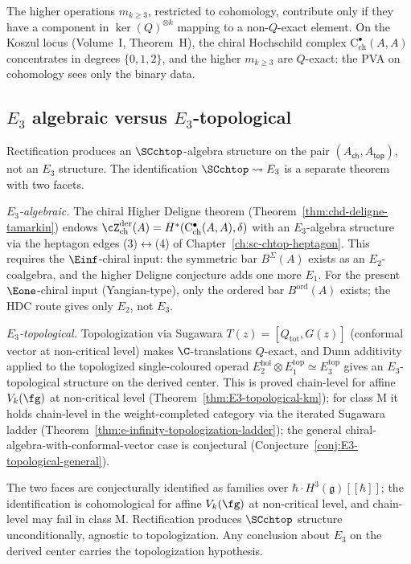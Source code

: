 The higher operations $m_{k \geq 3}$, restricted to cohomology,
contribute only if they have a component in $\ker(Q)^{\otimes k}$
mapping to a non-$Q$-exact element. On the Koszul locus
(Volume~I, Theorem~H), the chiral Hochschild complex
$\mathrm{C}^\bullet_{\mathrm{ch}}(A, A)$ concentrates in degrees
$\{0, 1, 2\}$, and the higher $m_{k \geq 3}$ are $Q$-exact: the PVA
on cohomology sees only the binary data.

\subsection{$E_3$ algebraic versus $E_3$-topological}
\label{subsec:e3-algebraic-vs-topological}

Rectification produces an $\SCchtop$-algebra structure on the pair
$(A_{\mathsf{ch}}, A_{\mathsf{top}})$, not an $E_3$ structure. The
identification $\SCchtop \rightsquigarrow E_3$ is a separate theorem
with two facets.

\emph{$E_3$-algebraic.} The chiral Higher Deligne theorem
(Theorem~\ref{thm:chd-deligne-tamarkin}) endows
$\cZ^{\mathrm{der}}_{\mathrm{ch}}(A) =
H^*(\mathrm{C}^\bullet_{\mathrm{ch}}(A, A), \delta)$ with an
$E_3$-algebra structure via the heptagon edges
(3)$\leftrightarrow$(4) of Chapter~\ref{ch:sc-chtop-heptagon}. This
requires the $\Einf$-chiral input: the symmetric bar $B^\Sigma(A)$
exists as an $E_2$-coalgebra, and the higher Deligne conjecture
adds one more $E_1$. For the present $\Eone$-chiral input
(Yangian-type), only the ordered bar $B^{\mathrm{ord}}(A)$ exists;
the HDC route gives only $E_2$, not $E_3$.

\emph{$E_3$-topological.} Topologization via Sugawara
$T(z) = [Q_{\mathrm{tot}}, G(z)]$ (conformal vector at non-critical
level) makes $\C$-translations $Q$-exact, and Dunn additivity
applied to the topologized single-coloured operad
$E_2^{\mathrm{hol}} \otimes E_1^{\mathrm{top}} \simeq
E_3^{\mathrm{top}}$ gives an $E_3$-topological structure on the
derived center. This is proved chain-level for affine $V_k(\fg)$ at
non-critical level (Theorem~\ref{thm:E3-topological-km}); for class M
it holds chain-level in the weight-completed category via the
iterated Sugawara ladder
(Theorem~\ref{thm:e-infinity-topologization-ladder});
the general chiral-algebra-with-conformal-vector case is
conjectural (Conjecture~\ref{conj:E3-topological-general}).

The two faces are conjecturally identified as families over
$\hbar \cdot H^3(\mathfrak{g})[[\hbar]]$; the identification is
cohomological for affine $V_k(\fg)$ at non-critical level, and
chain-level may fail in class M. Rectification produces $\SCchtop$
structure unconditionally, agnostic to topologization. Any
conclusion about $E_3$ on the derived center carries the
topologization hypothesis.

